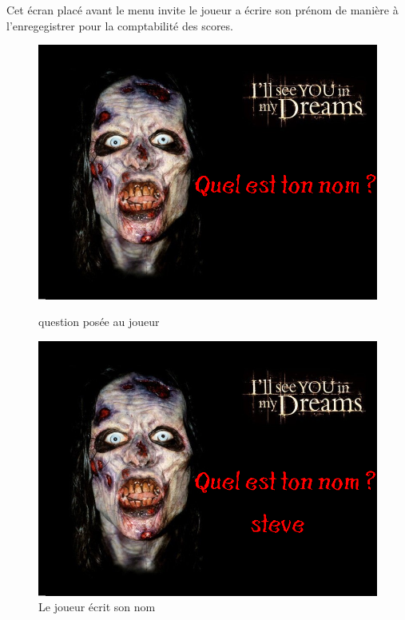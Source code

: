 Cet écran placé avant le menu invite le joueur a écrire son prénom de manière à l'enregegistrer pour la comptabilité des scores.
\begin{figure}[H]
   \begin{minipage}[c]{.46\linewidth}
      \includegraphics[scale=0.3]{img/accueilquestion.png}
			 \caption {question posée au joueur} 
   \end{minipage} \hfil
   \begin{minipage}[c]{.46\linewidth}
      \includegraphics[scale=0.3]{img/accueilnom.png}
			\caption {Le joueur écrit son nom} 
   \end{minipage}
\end{figure}

